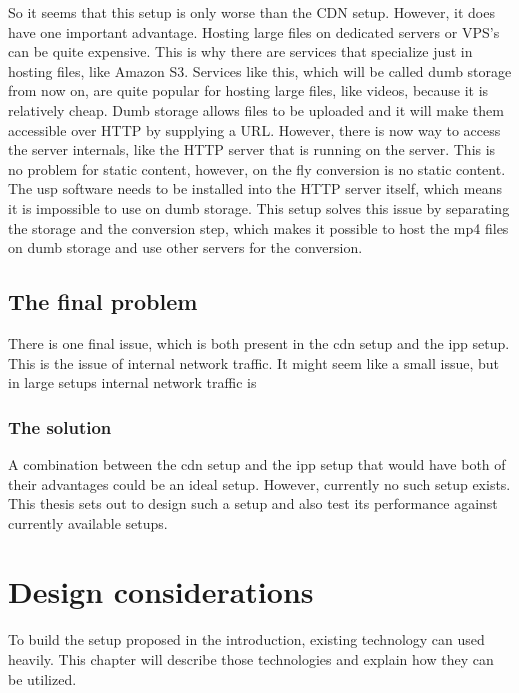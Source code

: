 \documentclass[twoside,openright]{uva-bachelor-thesis}
\begin{document}
So it seems that this setup is only worse than the CDN setup. However, it does
have one important advantage. Hosting large files on dedicated servers or VPS’s
can be quite expensive. This is why there are services that specialize just in
hosting files, like Amazon S3. Services like this, which will be called dumb
storage from now on, are quite popular for hosting large files, like videos,
because it is relatively cheap. Dumb storage allows files to be uploaded and it
will make them accessible over HTTP by supplying a URL\@. However, there is now
way to access the server internals, like the HTTP server that is running on the
server. This is no problem for static content, however, on the fly conversion is
no static content. The \gls{usp} software needs to be installed into the HTTP
server itself, which means it is impossible to use on dumb storage. This setup
solves this issue by separating the storage and the conversion step, which makes
it possible to host the mp4 files on dumb storage and use other servers for the
conversion.



\section{The final problem}
There is one final issue, which is both present in the \gls{cdn} setup and the
\gls{ipp} setup. This is the issue of internal network traffic. It might seem
like a small issue, but in large setups internal network traffic is

\subsection{The solution}
A combination between the \gls{cdn} setup and the \gls{ipp} setup that would
have both of their advantages could be an ideal setup. However, currently no
such setup exists. This thesis sets out to design such a setup and also test its
performance against currently available setups.







\chapter{Design considerations}
To build the setup proposed in the introduction, existing technology can used
heavily. This chapter will describe those technologies and explain how they can
be utilized.
\end{document}
